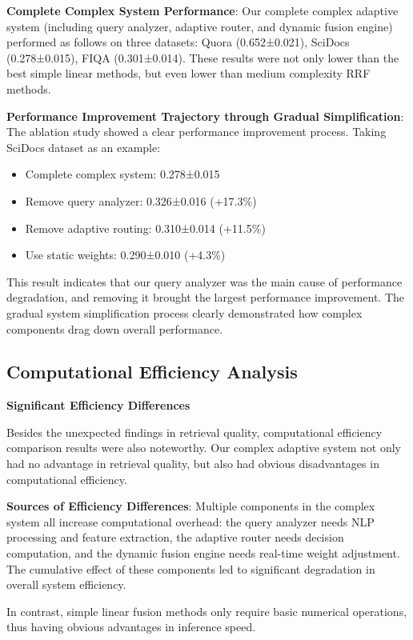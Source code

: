 \documentclass[letterpaper]{article} %
\begin{document}
\textbf{Complete Complex System Performance}: Our complete complex adaptive system (including query analyzer, adaptive router, and dynamic fusion engine) performed as follows on three datasets: Quora (0.652±0.021), SciDocs (0.278±0.015), FIQA (0.301±0.014). These results were not only lower than the best simple linear methods, but even lower than medium complexity RRF methods.

\textbf{Performance Improvement Trajectory through Gradual Simplification}: The ablation study showed a clear performance improvement process. Taking SciDocs dataset as an example:
\begin{itemize}
\item Complete complex system: 0.278±0.015
\item Remove query analyzer: 0.326±0.016 (+17.3\%)
\item Remove adaptive routing: 0.310±0.014 (+11.5\%)
\item Use static weights: 0.290±0.010 (+4.3\%)
\end{itemize}

This result indicates that our query analyzer was the main cause of performance degradation, and removing it brought the largest performance improvement. The gradual system simplification process clearly demonstrated how complex components drag down overall performance.

\subsection{Computational Efficiency Analysis}

\textbf{Significant Efficiency Differences}

Besides the unexpected findings in retrieval quality, computational efficiency comparison results were also noteworthy. Our complex adaptive system not only had no advantage in retrieval quality, but also had obvious disadvantages in computational efficiency.

\textbf{Sources of Efficiency Differences}:
Multiple components in the complex system all increase computational overhead: the query analyzer needs NLP processing and feature extraction, the adaptive router needs decision computation, and the dynamic fusion engine needs real-time weight adjustment. The cumulative effect of these components led to significant degradation in overall system efficiency.

In contrast, simple linear fusion methods only require basic numerical operations, thus having obvious advantages in inference speed.
\end{document}
